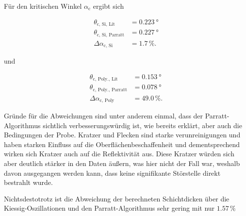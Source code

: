 Für den kritischen Winkel $\alpha_\text{c}$ ergibt sich

\begin{align*}
    \theta_\text{c, Si, Lit} &= \qty{0.223}{\degree} \\
    \theta_\text{c, Si, Parratt} &= \qty{0.227}{\degree} \\
    \Delta \alpha_\text{c, Si} &= \num{1.7} \, \%.
\end{align*}

und 

\begin{align*}
    \theta_\text{c, Poly., Lit} &= \qty{0.153}{\degree} \\
    \theta_\text{c, Poly., Parratt} &= \qty{0.078}{\degree} \\
    \Delta \alpha_\text{c, Poly} &= \num{49.0} \, \%.
\end{align*}

Gründe für die Abweichungen sind unter anderem einmal, dass der Parratt-Algorithmus sichtlich verbesserungswürdig ist, wie bereits erklärt,
aber auch die Bedingungen der Probe. Kratzer und Flecken sind starke verunreinigungen und haben starken Einfluss auf die Oberflächenbeschaffenheit und dementsprechend
wirken sich Kratzer auch auf die Reflektivität aus. Diese Kratzer würden sich aber deutlich stärker in den Daten äußern, was hier nicht der Fall war, weshalb davon ausgegangen werden kann, 
dass keine signifikante Störstelle direkt bestrahlt wurde.

Nichtsdestotrotz ist die Abweichung der berechneten Schichtdicken über die Kiessig-Oszillationen und den Parratt-Algorithmus 
sehr gering mit nur $\num{1.57} \, \%$